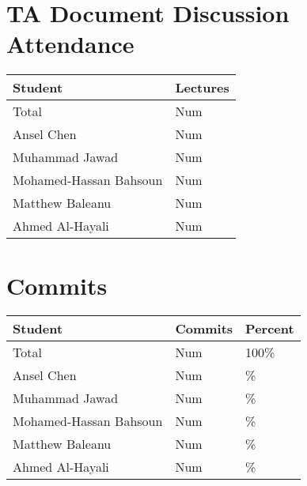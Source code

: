 \documentclass{article}
\begin{document}

\section{TA Document Discussion Attendance}


\begin{table}[H]
\centering
\begin{tabular}{ll}
\toprule
\textbf{Student} & \textbf{Lectures}\\
\midrule
Total & Num\\
Ansel Chen & Num\\
Muhammad Jawad & Num\\
Mohamed-Hassan Bahsoun & Num\\
Matthew Baleanu & Num\\
Ahmed Al-Hayali & Num\\
\bottomrule
\end{tabular}
\end{table}


\section{Commits}


\begin{table}[H]
\centering
\begin{tabular}{lll}
\toprule
\textbf{Student} & \textbf{Commits} & \textbf{Percent}\\
\midrule
Total & Num & 100\% \\
Ansel Chen & Num & \% \\
Muhammad Jawad & Num & \% \\
Mohamed-Hassan Bahsoun & Num & \% \\
Matthew Baleanu & Num & \% \\
Ahmed Al-Hayali & Num & \% \\
\bottomrule
\end{tabular}
\end{table}
\end{document}
